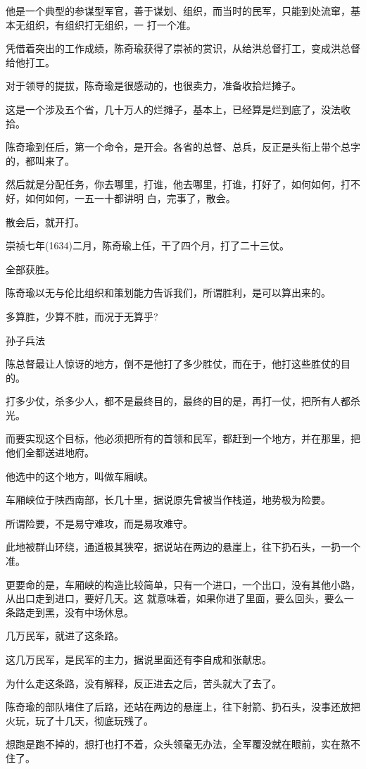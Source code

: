 \documentclass[11pt,a4paper,onecolumn]{article}
\begin{document}
他是一个典型的参谋型军官，善于谋划、组织，而当时的民军，只能到处流窜，基本无组织，有组织打无组织，一
打一个准。

凭借着突出的工作成绩，陈奇瑜获得了崇祯的赏识，从给洪总督打工，变成洪总督给他打工。

对于领导的提拔，陈奇瑜是很感动的，也很卖力，准备收拾烂摊子。

这是一个涉及五个省，几十万人的烂摊子，基本上，已经算是烂到底了，没法收拾。

陈奇瑜到任后，第一个命令，是开会。各省的总督、总兵，反正是头衔上带个总字的，都叫来了。

然后就是分配任务，你去哪里，打谁，他去哪里，打谁，打好了，如何如何，打不好，如何如何，一五一十都讲明
白，完事了，散会。

散会后，就开打。

崇祯七年(1634)二月，陈奇瑜上任，干了四个月，打了二十三仗。

全部获胜。

陈奇瑜以无与伦比组织和策划能力告诉我们，所谓胜利，是可以算出来的。

多算胜，少算不胜，而况于无算乎?

\myrule 孙子兵法

陈总督最让人惊讶的地方，倒不是他打了多少胜仗，而在于，他打这些胜仗的目的。

打多少仗，杀多少人，都不是最终目的，最终的目的是，再打一仗，把所有人都杀光。

而要实现这个目标，他必须把所有的首领和民军，都赶到一个地方，并在那里，把他们全都送进地府。

他选中的这个地方，叫做车厢峡。

车厢峡位于陕西南部，长几十里，据说原先曾被当作栈道，地势极为险要。

所谓险要，不是易守难攻，而是易攻难守。

此地被群山环绕，通道极其狭窄，据说站在两边的悬崖上，往下扔石头，一扔一个准。

更要命的是，车厢峡的构造比较简单，只有一个进口，一个出口，没有其他小路，从出口走到进口，要好几天。这
就意味着，如果你进了里面，要么回头，要么一条路走到黑，没有中场休息。

几万民军，就进了这条路。

这几万民军，是民军的主力，据说里面还有李自成和张献忠。

为什么走这条路，没有解释，反正进去之后，苦头就大了去了。

陈奇瑜的部队堵住了后路，还站在两边的悬崖上，往下射箭、扔石头，没事还放把火玩，玩了十几天，彻底玩残了。

想跑是跑不掉的，想打也打不着，众头领毫无办法，全军覆没就在眼前，实在熬不住了。
\end{document}
